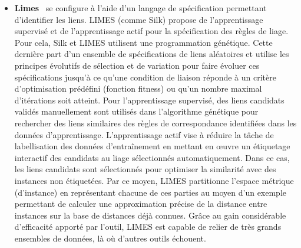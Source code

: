 \begin{itemize}
\item \textbf{Limes}~\cite{Ngomo2011} se configure à l'aide d'un langage de spécification permettant d'identifier les liens. LIMES (comme Silk) propose de l'apprentissage supervisé  et de l'apprentissage actif pour la spécification des règles de liage. Pour cela, Silk et LIMES utilisent une programmation génétique. Cette dernière part d'un ensemble de spécifications de liens aléatoires et utilise les principes évolutifs de sélection et de variation pour faire évoluer ces spécifications jusqu'à ce qu'une condition de liaison réponde à un critère d'optimisation prédéfini (fonction fitness) ou qu'un nombre maximal d'itérations soit atteint. Pour l'apprentissage supervisé, des liens candidats validés manuellement sont utilisés dans l'algorithme génétique pour rechercher des liens similaires des règles de correspondance identifiées dans les données d'apprentissage. L’apprentissage actif vise à réduire la tâche de labellisation des données d'entraînement en mettant en \oe uvre un étiquetage interactif des candidats au liage sélectionnés automatiquement. Dans ce cas, les liens candidats sont sélectionnés pour optimiser la similarité avec des instances non étiquetées. Par ce moyen, LIMES partitionne l'espace métrique (d'instance) en représentant chacune de ces parties au moyen d'un exemple permettant de calculer une approximation précise de la distance entre instances sur la base de distances déjà connues. Grâce au gain considérable d’efficacité apporté par l’outil, LIMES est capable de relier de très grands ensembles de données, là où d’autres outils échouent.\\



\end{itemize}
